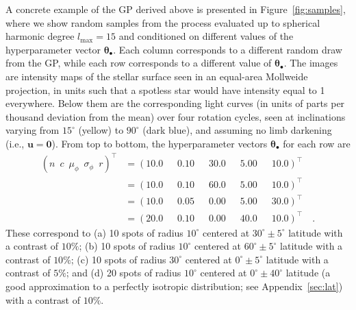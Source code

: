 \documentclass[modern]{aastex62}
\begin{document}
A concrete example of the GP derived above is presented in Figure~\ref{fig:samples},
where we show random samples from the process
evaluated up to spherical harmonic degree $l_\mathrm{max} = 15$ and
conditioned on different values
of the hyperparameter vector $\pmb{\theta}_\bullet$.
Each column corresponds to a different random draw from the GP, while each
row corresponds to a different value of $\pmb{\theta}_\bullet$.
The images are intensity maps of the stellar surface seen in an equal-area
Mollweide projection, in units such that a spotless star would have intensity
equal to 1 everywhere. Below them are the corresponding light curves (in units of
parts per thousand deviation from the mean) over four
rotation cycles, seen at inclinations varying from $15^\circ$ (yellow) to
$90^\circ$ (dark blue), and assuming no limb darkening (i.e., $\mathbf{u} = \mathbf{0}$).
From top to bottom, the hyperparameter vectors $\pmb{\theta}_\bullet$
for each row are
%
\begin{subequations}
    \begin{align}
        \left( n \,\,\, c \,\,\, \mu_\phi \,\,\, \sigma_\phi \,\,\, r\right)^\top
         & =\left( 10.0 \,\,\,\,\,\,\,\,\, 0.10 \,\,\,\,\,\,\,\,\, 30.0 \,\,\,\,\,\,\,\,\, 5.00 \,\,\,\,\,\,\,\,\, 10.0 \right)^\top \\
         & =\left( 10.0 \,\,\,\,\,\,\,\,\, 0.10 \,\,\,\,\,\,\,\,\, 60.0 \,\,\,\,\,\,\,\,\, 5.00 \,\,\,\,\,\,\,\,\, 10.0 \right)^\top \\
         & =\left( 10.0 \,\,\,\,\,\,\,\,\, 0.05 \,\,\,\,\,\,\,\,\, 0.00 \,\,\,\,\,\,\,\,\, 5.00 \,\,\,\,\,\,\,\,\, 30.0 \right)^\top \\
         & =\left( 20.0 \,\,\,\,\,\,\,\,\, 0.10 \,\,\,\,\,\,\,\,\, 0.00 \,\,\,\,\,\,\,\,\, 40.0 \,\,\,\,\,\,\,\,\, 10.0 \right)^\top
        \quad.
    \end{align}
\end{subequations}
%
These correspond to
(a) 10 spots of radius $10^\circ$ centered at
$30^\circ \pm 5^\circ$ latitude with a contrast of $10\%$;
(b) 10 spots of radius $10^\circ$ centered at
$60^\circ \pm 5^\circ$ latitude with a contrast of $10\%$;
(c) 10 spots of radius $30^\circ$ centered at
$0^\circ \pm 5^\circ$ latitude with a contrast of $5\%$;
and
(d) 20 spots of radius $10^\circ$ centered at
$0^\circ \pm 40^\circ$ latitude (a good approximation to a perfectly
isotropic distribution; see Appendix~\ref{sec:lat}) with a contrast of $10\%$.
\end{document}
